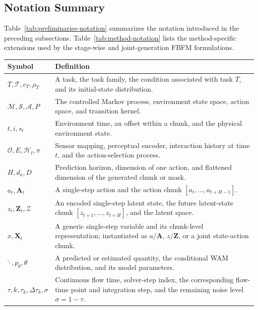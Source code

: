 \subsection{Notation Summary}
\label{sec:preliminaries:notation}

Table~\ref{tab:preliminaries-notation} summarizes the notation introduced in the
preceding subsections. Table~\ref{tab:method-notation} lists the method-specific
extensions used by the stage-wise and joint-generation FBFM formulations.

\begin{table}[t]
    \centering
    \scriptsize
    \renewcommand{\arraystretch}{1.12}
    \begin{tabular}{p{} p{}}
        \hline
        \textbf{Symbol} & \textbf{Definition}\\
        \hline
        $T,\mathcal{T},c_T,\rho_T$
        & A task, the task family, the condition associated with task $T$, and its initial-state distribution.\\
        $\mathcal{M},\mathcal{S},\mathcal{A},P$
        & The controlled Markov process, environment state space, action space, and transition kernel.\\
        $t,i,s_t$
        & Environment time, an offset within a chunk, and the physical environment state.\\
        $\mathcal{O},E,\mathcal{H}_t,\pi$
        & Sensor mapping, perceptual encoder, interaction history at time $t$, and the action-selection process.\\
        $H,d_a,D$
        & Prediction horizon, dimension of one action, and flattened dimension of the generated chunk or mask.\\
        $a_t,\mathbf{A}_t$
        & A single-step action and the action chunk $[a_t,\ldots,a_{t+H-1}]$.\\
        $z_t,\mathbf{Z}_t,\mathcal{Z}$
        & An encoded single-step latent state, the future latent-state chunk $[z_{t+1},\ldots,z_{t+H}]$, and the latent space.\\
        $x,\mathbf{X}_t$
        & A generic single-step variable and its chunk-level representation; instantiated as $a/\mathbf A$, $z/\mathbf Z$, or a joint state-action chunk.\\
        $\hat{\cdot},p_\theta,\theta$
        & A predicted or estimated quantity, the conditional WAM distribution, and its model parameters.\\
        $\tau,k,\tau_k,\Delta\tau_k,\sigma$
        & Continuous flow time, solver-step index, the corresponding flow-time point and integration step, and the remaining noise level $\sigma=1-\tau$.\\

\end{tabular}
\end{table}

